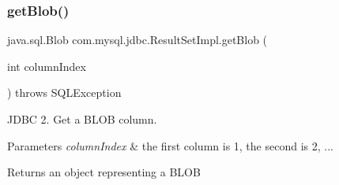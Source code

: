 \subsubsection{\texorpdfstring{get\+Blob()}{getBlob()}\hspace{0.1cm}{\footnotesize\ttfamily [1/2]}}
{\footnotesize\ttfamily java.\+sql.\+Blob com.\+mysql.\+jdbc.\+Result\+Set\+Impl.\+get\+Blob (\begin{DoxyParamCaption}\item[{int}]{column\+Index }\end{DoxyParamCaption}) throws S\+Q\+L\+Exception}

J\+D\+BC 2. Get a B\+L\+OB column.


\begin{DoxyParams}{Parameters}
{\em column\+Index} & the first column is 1, the second is 2, ...\\
\hline
\end{DoxyParams}
\begin{DoxyReturn}{Returns}
an object representing a B\+L\+OB
\end{DoxyReturn}

